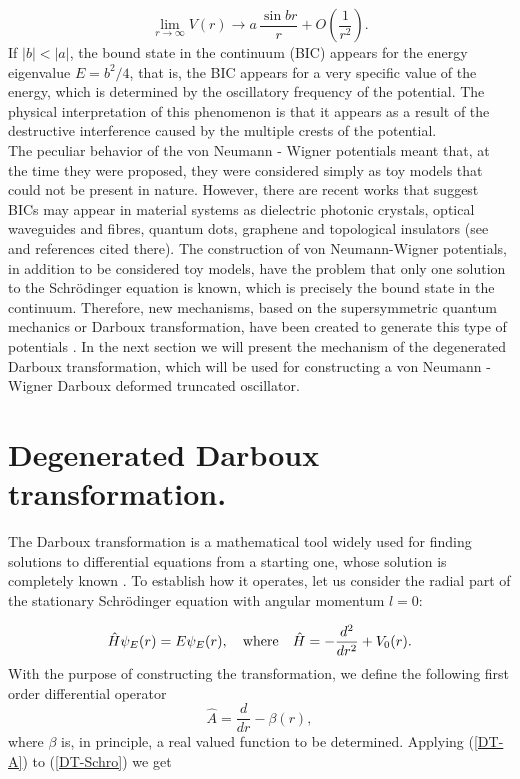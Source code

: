 \documentclass[a4paper]{jpconf}
\begin{document}
\begin{equation}
\lim_{r\rightarrow\infty}V(r) \rightarrow a\,\frac{\sin{br}}{r}+ O\left(\frac{1}{r^2}\right).\label{vNW-V2}
\end{equation}
If $|b| <|a|$, the bound state in the continuum (BIC) appears for the energy eigenvalue $E=b^2/4$, that is, the BIC appears for a very specific value of the energy, which is determined by the oscillatory frequency of the potential. The physical interpretation of this phenomenon is that it appears as a result of the destructive interference caused by the multiple crests of the potential.\\
The peculiar behavior of the von Neumann - Wigner potentials meant that, at the time they were proposed, they were considered simply as toy models that could not be present in nature. However, there are recent works that suggest BICs may appear in material systems as dielectric photonic crystals, optical waveguides and fibres, quantum dots,
graphene and topological insulators (see \cite{Nature} and references cited there). The construction of von Neumann-Wigner  potentials, in addition to be considered toy models, have the problem that only one solution to the Schr\" odinger equation is known, which is precisely the bound state in the continuum. Therefore, new mechanisms, based on the supersymmetric quantum mechanics or Darboux transformation, have been created to generate this type of potentials \cite{Pappademos,Mondragon,Nico1,Nico2}. In the next section we will present the mechanism of the degenerated Darboux transformation, which will be used for constructing a von Neumann - Wigner Darboux deformed truncated oscillator.

\section{Degenerated Darboux transformation.}

The Darboux transformation is a mathematical tool widely used for finding solutions to differential equations from a starting one, whose solution is completely known \cite{Nico3,Springer,Nico4}. To establish how it operates, let us consider the radial part of the stationary Schr\" odinger  equation with angular momentum $l=0$:

\begin{equation}
\hat{H}\psi_E(r)=E\psi_E(r),\quad {\rm where}\quad \hat{H}=-\frac{d^2}{dr^2}+V_0(r). \label{DT-Schro}
\end{equation}
With the purpose of constructing the transformation, we define the following first order differential operator
\begin{equation}
\hat{A}=\frac{d}{dr}-\beta(r), \label{DT-A}
\end{equation}
where $\beta$ is, in principle,  a real valued function to be determined. Applying (\ref{DT-A}) to (\ref{DT-Schro}) we get
\end{document}
